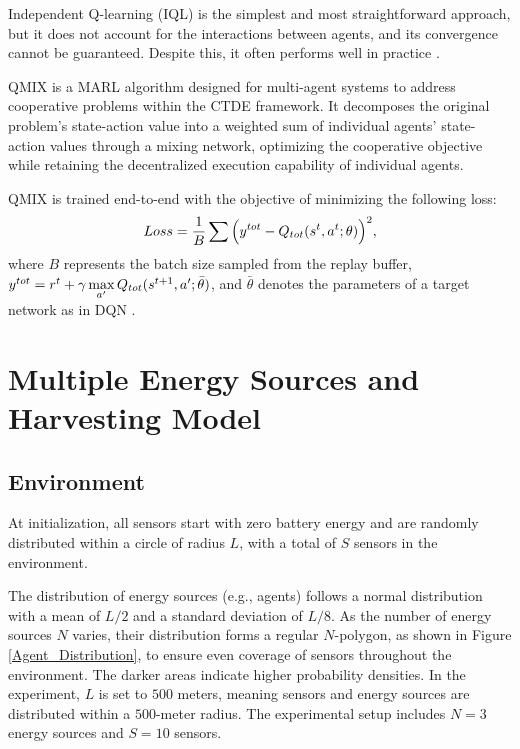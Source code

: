\documentclass{article}
\begin{document}
Independent Q-learning (IQL) \cite{tan1993multi} is the simplest and most straightforward approach, but it does not account for the interactions between agents, and its convergence cannot be guaranteed. Despite this, it often performs well in practice \cite{tampuu2017multiagent}.

QMIX \cite{rashid2020monotonic} is a MARL algorithm designed for multi-agent systems to address cooperative problems within the CTDE framework. It decomposes the original problem's state-action value into a weighted sum of individual agents' state-action values through a mixing network, optimizing the cooperative objective while retaining the decentralized execution capability of individual agents.

QMIX is trained end-to-end with the objective of minimizing the following loss:
\begin{equation}\label{loss}
Loss={1\over B}\sum\Big(y^{tot}-Q_{tot}(s^{t},a^t;\theta)\Big)^2,
\end{equation}
where $B$ represents the batch size sampled from the replay buffer, $y^{tot} = \normalsize r^t+\gamma \mathop{\max}\limits_{a'}Q_{tot}(s^{t+1},a';\bar\theta)$, and $\bar\theta$ denotes the parameters of a target network as in DQN \cite{mnih2013playing}.

\section{Multiple Energy Sources and Harvesting Model}


\subsection{Environment}

At initialization, all sensors start with zero battery energy and are randomly distributed within a circle of radius $L$, with a total of $S$ sensors in the environment.

The distribution of energy sources (e.g., agents) follows a normal distribution with a mean of $L/2$ and a standard deviation of $L/8$. As the number of energy sources $N$ varies, their distribution forms a regular $N$-polygon, as shown in Figure \ref{Agent_Distribution}, to ensure even coverage of sensors throughout the environment. The darker areas indicate higher probability densities. In the experiment, $L$ is set to $500$ meters, meaning sensors and energy sources are distributed within a $500$-meter radius. The experimental setup includes $N=3$ energy sources and $S=10$ sensors.
\end{document}
